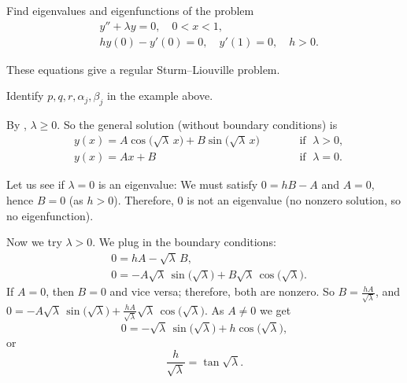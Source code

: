 \begin{example}
Find eigenvalues and eigenfunctions of the problem
\begin{align*}
& y''+\lambda y = 0, \quad 0 < x < 1 , \\
& hy(0)- y'(0) = 0, \quad y'(1)  = 0, \quad h > 0.
\end{align*}

These equations give a regular Sturm--Liouville problem.

\begin{exercise}
Identify $p, q, r, \alpha_j, \beta_j$ in the example above.
\end{exercise}

By ,
$\lambda \geq 0$.
So the general solution (without boundary conditions) is
\begin{equation*}
\begin{aligned}
 & y(x) = A \cos \bigl( \sqrt{\lambda}\, x\bigr)
+ B \sin \bigl( \sqrt{\lambda}\, x\bigr) & & \qquad \text{if } \; \lambda > 0 , \\
& y(x) = A x + B & & \qquad \text{if } \; \lambda = 0 .
\end{aligned}
\end{equation*}

Let us see if $\lambda = 0$ is an eigenvalue:
We must satisfy $0 = hB - A$ and $A = 0$, hence $B=0$ (as $h > 0$).
Therefore, 0 is not an eigenvalue (no nonzero solution, so no eigenfunction).

Now we
try $\lambda > 0$.  We plug in the boundary conditions:
\begin{align*}
& 0 = h A - \sqrt{\lambda}\, B , \\
& 0 = -A \sqrt{\lambda}\, \sin \bigl(\sqrt{\lambda}\bigr)
+ B \sqrt{\lambda}\, \cos \bigl(\sqrt{\lambda}\bigr) .
\end{align*}
If $A=0$, then $B=0$ and vice versa; therefore, both are nonzero.
So $B = \frac{hA}{\sqrt{\lambda}}$, and
$0 = -A \sqrt{\lambda}\, \sin \bigl( \sqrt{\lambda}\bigr) + \frac{hA}{\sqrt{\lambda}}
\sqrt{\lambda}\, \cos \bigl( \sqrt{\lambda}\bigr)$.  As $A \not= 0$ we get
\begin{equation*}
0 = 
- \sqrt{\lambda}\, \sin \bigl( \sqrt{\lambda}\bigr)
+ h \cos \bigl( \sqrt{\lambda}\bigr) ,
\end{equation*}
or
\begin{equation*}
\frac{h}{\sqrt{\lambda}} = \tan \sqrt{\lambda} .
\end{equation*}


\end{example}

